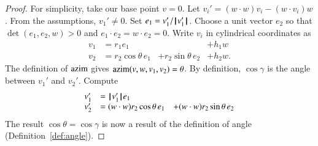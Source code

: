 \begin{proof}  For simplicity,  take our base point $v=0$.
Let $v_i' = (w\cdot w) v_i - (w\cdot v_i) w$.  
From the assumptions, $v_1'\ne 0$.  Set $e_1 = v_1'/{{\hskip0.1em|\hskip-0.15em|\hskip0.1em}v'_1{\hskip0.1em|\hskip-0.15em|\hskip0.1em}}$.  Choose a unit vector
$e_2$ so that $\det(e_1,e_2,w)>0$ and $e_1\cdot e_2 = w\cdot e_2=0$.
Write $v_i$ in cylindrical coordinates as 
   $$
   \begin{array}{lllll}
     v_1 &= r_1 e_1 &    &+h_1 w\\
     v_2 &= r_2 \cos\theta\, e_1 &+ r_2 \sin\theta\, e_2 &+ h_2 w.
    \end{array}
   $$
The definition of ${\operatorname{azim}}$ gives ${\operatorname{azim}}(v,w,v_1,v_2)=\theta$.  
By definition, $\cos\gamma$ is the angle between $v_1'$ and $v_2'$.
Compute
   $$
   \begin{array}{lll}
     v_1' &= {{\hskip0.1em|\hskip-0.15em|\hskip0.1em}v'_1{\hskip0.1em|\hskip-0.15em|\hskip0.1em}} e_1 \\
     v_2' &= (w\cdot w) r_2 \cos\theta\, e_1 
       &+ (w\cdot w) r_2 \sin\theta\, e_2 \\
     \end{array}
   $$
The result $\cos\theta=\cos\gamma$ 
is now a result of the definition of angle 
(Definition~\ref{def:angle}).
\end{proof}
%
%






